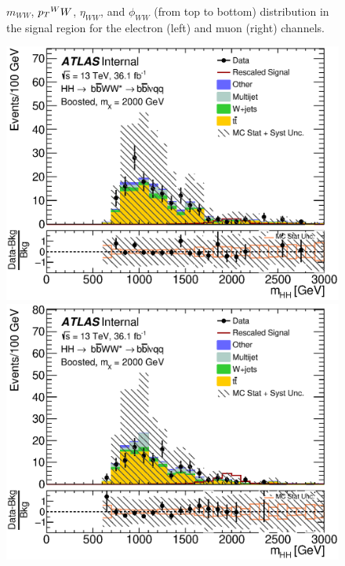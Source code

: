 \begin{figure}[h]
\begin{center}
\caption[Kinematic distributions in the signal region for the electron and muon channels]{$m_{WW}$, $\pt^WW$, $\eta_{WW}$, and $\phi_{WW}$ (from top to bottom) distribution in the signal region for the electron (left) and muon (right) channels.}
\end{center}
\end{figure}
\newpage

\begin{figure}[h]
\begin{center}
\includegraphics[scale=0.33]{figures/kinplots/new/C_2tag_SR_elec_presel_met50_hhMassRebin1}
\includegraphics[scale=0.33]{figures/kinplots/new/C_2tag_SR_muon_presel_met50_hhMassRebin1}\\

\end{center}
\end{figure}
